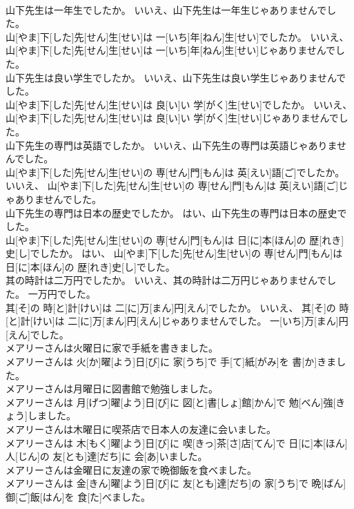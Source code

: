 \documentclass[8pt]{extreport}
\begin{document}
\begin{CJK}{UTF8}{min}
\\	山下先生は一年生でしたか。 いいえ、山下先生は一年生じゃありませんでした。	
\\	山[やま]下[した]先[せん]生[せい]は 一[いち]年[ねん]生[せい]でしたか。 いいえ、 山[やま]下[した]先[せん]生[せい]は 一[いち]年[ねん]生[せい]じゃありませんでした。
\\	山下先生は良い学生でしたか。 いいえ、山下先生は良い学生じゃありませんでした。	
\\	山[やま]下[した]先[せん]生[せい]は 良[い]い 学[がく]生[せい]でしたか。 いいえ、 山[やま]下[した]先[せん]生[せい]は 良[い]い 学[がく]生[せい]じゃありませんでした。
\\	山下先生の専門は英語でしたか。 いいえ、山下先生の専門は英語じゃありませんでした。	
\\	山[やま]下[した]先[せん]生[せい]の 専[せん]門[もん]は 英[えい]語[ご]でしたか。 いいえ、 山[やま]下[した]先[せん]生[せい]の 専[せん]門[もん]は 英[えい]語[ご]じゃありませんでした。
\\	山下先生の専門は日本の歴史でしたか。 はい、山下先生の専門は日本の歴史でした。	
\\	山[やま]下[した]先[せん]生[せい]の 専[せん]門[もん]は 日[に]本[ほん]の 歴[れき]史[し]でしたか。 はい、 山[やま]下[した]先[せん]生[せい]の 専[せん]門[もん]は 日[に]本[ほん]の 歴[れき]史[し]でした。
\\	其の時計は二万円でしたか。 いいえ、其の時計は二万円じゃありませんでした。 一万円でした。	
\\	其[そ]の 時[と]計[けい]は 二[に]万[まん]円[えん]でしたか。 いいえ、 其[そ]の 時[と]計[けい]は 二[に]万[まん]円[えん]じゃありませんでした。 一[いち]万[まん]円[えん]でした。
\\	メアリーさんは火曜日に家で手紙を書きました。	
\\	メアリーさんは 火[か]曜[よう]日[び]に 家[うち]で 手[て]紙[がみ]を 書[か]きました。
\\	メアリーさんは月曜日に図書館で勉強しました。	
\\	メアリーさんは 月[げつ]曜[よう]日[び]に 図[と]書[しょ]館[かん]で 勉[べん]強[きょう]しました。
\\	メアリーさんは木曜日に喫茶店で日本人の友達に会いました。	
\\	メアリーさんは 木[もく]曜[よう]日[び]に 喫[きっ]茶[さ]店[てん]で 日[に]本[ほん]人[じん]の 友[とも]達[だち]に 会[あ]いました。
\\	メアリーさんは金曜日に友達の家で晩御飯を食べました。	
\\	メアリーさんは 金[きん]曜[よう]日[び]に 友[とも]達[だち]の 家[うち]で 晩[ばん]御[ご]飯[はん]を 食[た]べました。

\end{CJK}
\end{document}
